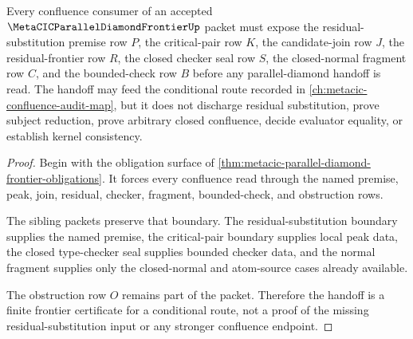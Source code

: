 \begin{theorem}
\label{thm:metacic-parallel-diamond-frontier-handoff}
Every confluence consumer of an accepted $\MetaCICParallelDiamondFrontierUp$ packet must expose the residual-substitution premise row $P$, the critical-pair row $K$, the candidate-join row $J$, the residual-frontier row $R$, the closed checker seal row $S$, the closed-normal fragment row $C$, and the bounded-check row $B$ before any parallel-diamond handoff is read. The handoff may feed the conditional route recorded in \autoref{ch:metacic-confluence-audit-map}, but it does not discharge residual substitution, prove subject reduction, prove arbitrary closed confluence, decide evaluator equality, or establish kernel consistency.
\end{theorem}
\begin{proof}
Begin with the obligation surface of \autoref{thm:metacic-parallel-diamond-frontier-obligations}. It forces every confluence read through the named premise, peak, join, residual, checker, fragment, bounded-check, and obstruction rows.

The sibling packets preserve that boundary. The residual-substitution boundary supplies the named premise, the critical-pair boundary supplies local peak data, the closed type-checker seal supplies bounded checker data, and the normal fragment supplies only the closed-normal and atom-source cases already available.

The obstruction row $O$ remains part of the packet. Therefore the handoff is a finite frontier certificate for a conditional route, not a proof of the missing residual-substitution input or any stronger confluence endpoint.
\end{proof}

